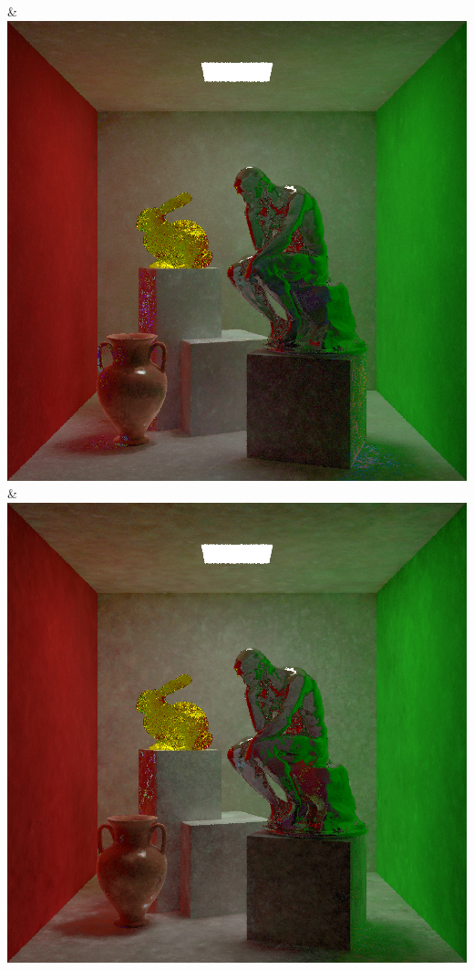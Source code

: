 & \includegraphics[width=\linewidth]{figures/py/tests/quality_comparison/nrc+sppc14@1_1spp_thinker.png}
& \includegraphics[width=\linewidth]{figures/py/tests/quality_comparison/nrc+sppc14@4_1spp_thinker.png}
